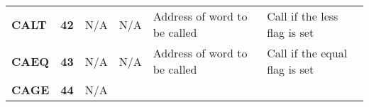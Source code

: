 \documentclass[]{article}
\begin{document}
\begin{longtable}[c]{@{}llllll@{}}
\begin{minipage}[t]{0.14\columnwidth}
\textbf{CALT}
\strut\end{minipage} &
\begin{minipage}[t]{0.14\columnwidth}\raggedright\strut
\textbf{42}
\strut\end{minipage} &
\begin{minipage}[t]{0.14\columnwidth}\raggedright\strut
N/A
\strut\end{minipage} &
\begin{minipage}[t]{0.14\columnwidth}\raggedright\strut
N/A
\strut\end{minipage} &
\begin{minipage}[t]{0.14\columnwidth}\raggedright\strut
Address of word to be called
\strut\end{minipage} &
\begin{minipage}[t]{0.14\columnwidth}\raggedright\strut
Call if the less flag is set
\strut\end{minipage}\tabularnewline
\begin{minipage}[t]{0.14\columnwidth}\raggedright\strut
\textbf{CAEQ}
\strut\end{minipage} &
\begin{minipage}[t]{0.14\columnwidth}\raggedright\strut
\textbf{43}
\strut\end{minipage} &
\begin{minipage}[t]{0.14\columnwidth}\raggedright\strut
N/A
\strut\end{minipage} &
\begin{minipage}[t]{0.14\columnwidth}\raggedright\strut
N/A
\strut\end{minipage} &
\begin{minipage}[t]{0.14\columnwidth}\raggedright\strut
Address of word to be called
\strut\end{minipage} &
\begin{minipage}[t]{0.14\columnwidth}\raggedright\strut
Call if the equal flag is set
\strut\end{minipage}\tabularnewline
\begin{minipage}[t]{0.14\columnwidth}\raggedright\strut
\textbf{CAGE}
\strut\end{minipage} &
\begin{minipage}[t]{0.14\columnwidth}\raggedright\strut
\textbf{44}
\strut\end{minipage} &
\begin{minipage}[t]{0.14\columnwidth}\raggedright\strut
N/A
\strut\end{minipage} &
\begin{minipage}[t]{0.14\columnwidth}\raggedright\strut

\end{minipage}
\end{longtable}
\end{document}
